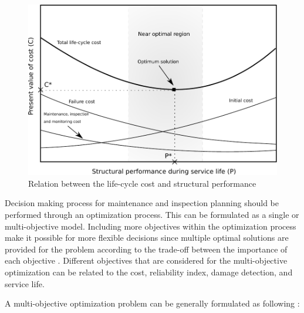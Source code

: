 \begin{figure}[hbt!]
\centering
  \includegraphics[width=0.75\linewidth]{figures/fig-ch1/lifecyclecost.pdf}
  \caption{Relation between the life-cycle cost and structural performance}
  \label{fig:lifecyclecost}
\end{figure}

Decision making process for maintenance and inspection planning should be performed through an optimization process. This can be formulated as a single or multi-objective 
model. Including more objectives within the optimization process make it possible for more flexible decisions since multiple optimal solutions are provided for the problem according to 
the trade-off between the importance of each objective \citep{Kim2017, KIM2018356}. Different objectives that are considered for the multi-objective optimization can be related to the cost, reliability 
index, damage detection, and service life. 

A multi-objective optimization problem can be generally formulated as following \citep{AUGUSTO2012}:

